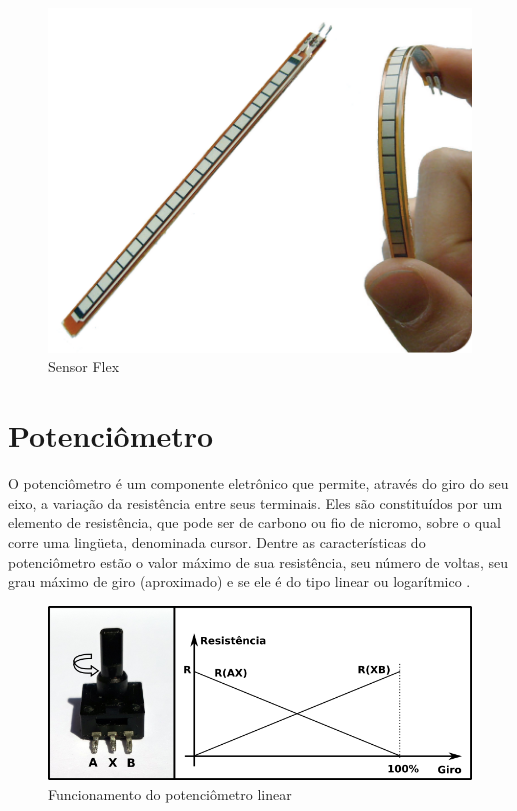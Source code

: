 \documentclass{ufpatcc}
\begin{document}
		\begin{figure}[h!]
  		\label{fig:flex-sensor1}
			\centering
  		\includegraphics[scale=0.4]{../pictures/flex-sensor-sparkfun.png}
  		\caption{Sensor Flex}
		\end{figure}


		\section{Potenciômetro}
		O potenciômetro é um componente eletrônico que permite, através do giro do seu eixo, a variação da resistência entre seus terminais. Eles são constituídos por um elemento de resistência, que pode ser de carbono ou fio de nicromo, sobre o qual corre uma lingüeta, denominada cursor. Dentre as características do potenciômetro estão o valor máximo de sua resistência, seu número de voltas, seu grau máximo de giro (aproximado) e se ele é do tipo linear ou logarítmico \cite{ncb2012eletronicabasica}.


		\begin{figure}[h!]
  		\label{fig:pot1}
			\centering
  		\includegraphics[scale=0.7]{../pictures/potentiometer1.png}
  		\caption{Funcionamento do potenciômetro linear}
		\end{figure}
\end{document}
